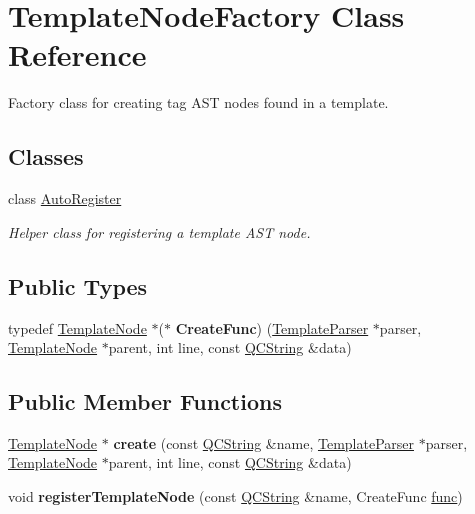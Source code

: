 \hypertarget{class_template_node_factory}{}\section{Template\+Node\+Factory Class Reference}
\label{class_template_node_factory}


Factory class for creating tag A\+ST nodes found in a template.  


\subsection*{Classes}
\begin{DoxyCompactItemize}
\item 
class \mbox{\hyperlink{class_template_node_factory_1_1_auto_register}{Auto\+Register}}
\begin{DoxyCompactList}\small\item\em Helper class for registering a template A\+ST node. \end{DoxyCompactList}\end{DoxyCompactItemize}
\subsection*{Public Types}
\begin{DoxyCompactItemize}
\item 
\mbox{\label{class_template_node_factory_a59ae33c1e37ddecd982358a5417fab31}} 
typedef \mbox{\hyperlink{class_template_node}{Template\+Node}} $\ast$($\ast$ {\bfseries Create\+Func}) (\mbox{\hyperlink{class_template_parser}{Template\+Parser}} $\ast$parser, \mbox{\hyperlink{class_template_node}{Template\+Node}} $\ast$parent, int line, const \mbox{\hyperlink{class_q_c_string}{Q\+C\+String}} \&data)
\end{DoxyCompactItemize}
\subsection*{Public Member Functions}
\begin{DoxyCompactItemize}
\item 
\mbox{\label{class_template_node_factory_acad608d0e42a69f2e4ad3caa05388d32}} 
\mbox{\hyperlink{class_template_node}{Template\+Node}} $\ast$ {\bfseries create} (const \mbox{\hyperlink{class_q_c_string}{Q\+C\+String}} \&name, \mbox{\hyperlink{class_template_parser}{Template\+Parser}} $\ast$parser, \mbox{\hyperlink{class_template_node}{Template\+Node}} $\ast$parent, int line, const \mbox{\hyperlink{class_q_c_string}{Q\+C\+String}} \&data)
\item 
\mbox{\label{class_template_node_factory_a1a032751feb62597c052da0548b56e95}} 
void {\bfseries register\+Template\+Node} (const \mbox{\hyperlink{class_q_c_string}{Q\+C\+String}} \&name, Create\+Func \mbox{\hyperlink{070__ref__variadic__template_8cpp_abb1e0338f72ae46a1240ada65d6a397c}{func}})
\end{DoxyCompactItemize}
